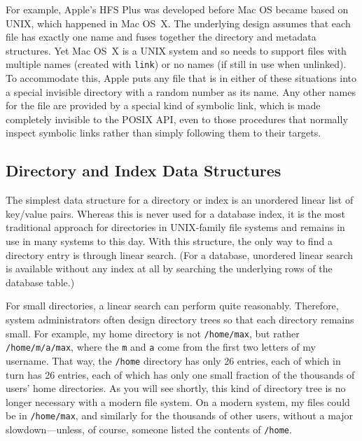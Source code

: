For example, Apple's HFS Plus was developed before Mac OS became
based on UNIX, which happened in Mac OS~X.  The underlying design assumes that each
file has exactly one name and fuses together the directory and
metadata structures.  Yet Mac OS~X is a UNIX system
and so needs to support files with multiple names (created with
\verb|link|) or no names (if still in use when unlinked).  To
accommodate this, Apple puts any file that is in either of these
situations into a special invisible directory with a random number as
its name.  Any other names for the file are provided by a special kind
of symbolic link, which is made completely invisible to the POSIX API,
even to those procedures that normally inspect symbolic links
rather than simply following them to their targets.

\subsection{Directory and Index Data Structures}\label{directory-index-structures-section}

The simplest data structure for a directory or index is an unordered
linear list of key/value pairs.  Whereas this is never used for a
database index, it is the most traditional approach for directories in
UNIX-family file systems and remains in use in many systems to this
day.  With this structure, the only way to find a directory entry is
through linear search. (For a database, unordered linear search is
available without any index at all by searching the underlying
rows of the database table.)

For small directories, a linear search can perform quite reasonably.
Therefore, system administrators often design directory trees so that
each directory remains small.  For example, my home directory is not
\verb|/home/max|, but rather
\verb|/home/m/a/max|, where the \verb|m| and \verb|a| come from the
first two letters of my username.  That way, the \verb|/home|
directory has only 26 entries, each of which in turn has 26
entries, each of which has only one small fraction of the thousands of
users' home directories.  As you will see shortly, this kind of directory
tree is no longer necessary with a modern file system.  On a modern
system, my files could be in \verb|/home/max|, and similarly for the
thousands of other users, without a major slowdown---unless, of
course, someone listed the contents of \verb|/home|.

